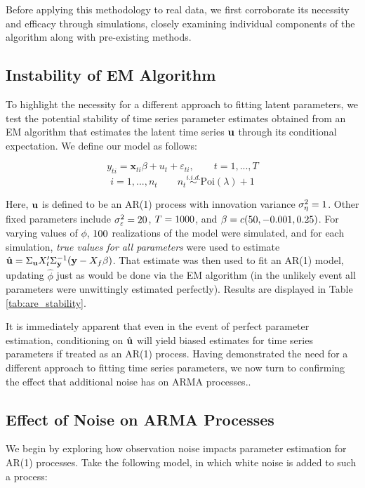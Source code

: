 Before applying this methodology to real data, we first corroborate its necessity and
efficacy through simulations, closely examining individual components of the algorithm
along with pre-existing methods. 

\subsection{Instability of EM Algorithm}

To highlight the necessity for a different approach to fitting latent parameters,
we test the potential stability of time series parameter estimates obtained 
from an EM algorithm that estimates the latent time series $\mathbf{u}$ through its conditional expectation.
We define our model as follows:

$$ y_{ti} = \mathbf{x}_{ti} \beta + u_t + \varepsilon_{ti}, \qquad t = 1,...,T $$
$$i = 1,...,n_t \qquad n_t \overset{i.i.d.}{\sim} \text{Poi}(\lambda) + 1 $$

Here, $\mathbf{u}$ is defined to be an AR(1) process with innovation variance $\sigma_\eta^2 = 1$. 
Other fixed parameters include $\sigma_\varepsilon^2 = 20$, $T = 1000$, and $\beta = c(50,-0.001,0.25)$.
For varying values of $\phi$, $100$ realizations of the model were simulated,
and for each simulation, \emph{true values for all parameters} were used to 
estimate $\hat{\mathbf{u}} = \Sigma_{\mathbf{u}} X_t' \Sigma_{\mathbf{y}}^{-1}(\mathbf{y} - X_f \beta)$. That estimate
was then used to fit an AR(1) model, updating $\hat{\phi}$ just as would be done
via the EM algorithm (in the unlikely event all parameters were unwittingly estimated perfectly).
Results are displayed in Table \ref{tab:are_stability}.



It is immediately apparent that even in the event of perfect parameter estimation,
conditioning on $\hat{\mathbf{u}}$ will yield biased estimates for time series parameters if treated as an AR(1) process.
Having demonstrated the need for a different approach to fitting time series parameters, 
we now turn to confirming the effect that additional noise has on ARMA processes..

\subsection{Effect of Noise on ARMA Processes}

We begin by exploring how observation noise impacts parameter estimation for 
AR(1) processes. Take the following model, in which white noise is added to such a process:


